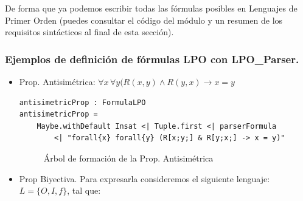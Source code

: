 \documentclass[a4paper]{report}
\begin{document}
De forma que ya podemos escribir todas las fórmulas posibles en Lenguajes de Primer Orden (puedes consultar el código del módulo y un resumen de los requisitos sintácticos al final de esta sección).

\subsubsection{Ejemplos de definición de fórmulas LPO con LPO\_Parser.}

\begin{itemize}
\item Prop. Antisimétrica: $\forall x \, \forall y (R(x,y) \wedge R(y,x) \rightarrow x = y$

\begin{lstlisting}[caption={ParserLPO. Definición de la de la Prop. Antisimétrica.}, mathescape=true]
antisimetricProp : FormulaLPO
antisimetricProp = 
    Maybe.withDefault Insat <| Tuple.first <| parserFormula 
        <| "forall{x} forall{y} (R[x;y;] & R[y;x;] -> x = y)"
\end{lstlisting}

\begin{figure}[H]
\centering
{}
\caption{Árbol de formación de la Prop. Antisimétrica}
\end{figure}

\item Prop Biyectiva. Para expresarla consideremos el siguiente lenguaje: $L= \{O, I, f\}$, tal que:


\end{itemize}
\end{document}
